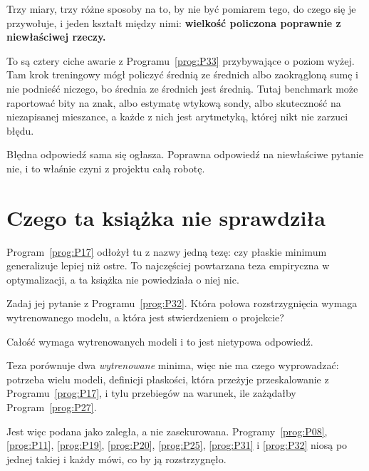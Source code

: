 \begin{fr}
Trzy miary, trzy różne sposoby na to, by nie być pomiarem tego, do czego się
je przywołuje, i jeden kształt między nimi: \textbf{wielkość policzona
poprawnie z niewłaściwej rzeczy.}

To są cztery ciche awarie z Programu~\ref{prog:P33} przybywające o poziom
wyżej. Tam krok treningowy mógł policzyć średnią ze średnich albo zaokrągloną
sumę i nie podnieść niczego, bo średnia ze średnich jest średnią. Tutaj
benchmark może raportować bity na znak, albo estymatę wtykową sondy, albo
skuteczność na niezapisanej mieszance, a każde z nich jest arytmetyką, której
nikt nie zarzuci błędu.

Błędna odpowiedź sama się ogłasza. Poprawna odpowiedź na niewłaściwe pytanie
nie, i to właśnie czyni z projektu całą robotę.
\end{fr}

\section{Czego ta książka nie sprawdziła}
\label{sec:P34-not-checked}

\begin{fr}
Program~\ref{prog:P17} odłożył tu z nazwy jedną tezę: czy płaskie minimum
generalizuje lepiej niż ostre. To najczęściej powtarzana teza empiryczna w
optymalizacji, a ta książka nie powiedziała o niej nic.

Zadaj jej pytanie z Programu~\ref{prog:P32}. Która połowa rozstrzygnięcia
wymaga wytrenowanego modelu, a która jest stwierdzeniem o projekcie?
\dotline
\nextframe
\end{fr}

\begin{fr}
\begin{ansblock}
Całość wymaga wytrenowanych modeli i to jest nietypowa odpowiedź.

Teza porównuje dwa \emph{wytrenowane} minima, więc nie ma czego wyprowadzać:
potrzeba wielu modeli, definicji płaskości, która przeżyje przeskalowanie z
Programu~\ref{prog:P17}, i tylu przebiegów na warunek, ile zażądałby
Program~\ref{prog:P27}.
\end{ansblock}

Jest więc podana jako zaległa, a nie zasekurowana.
Programy~\ref{prog:P08}, \ref{prog:P11}, \ref{prog:P19}, \ref{prog:P20},
\ref{prog:P25}, \ref{prog:P31} i \ref{prog:P32} niosą po jednej takiej i
każdy mówi, co by ją rozstrzygnęło.
\end{fr}

